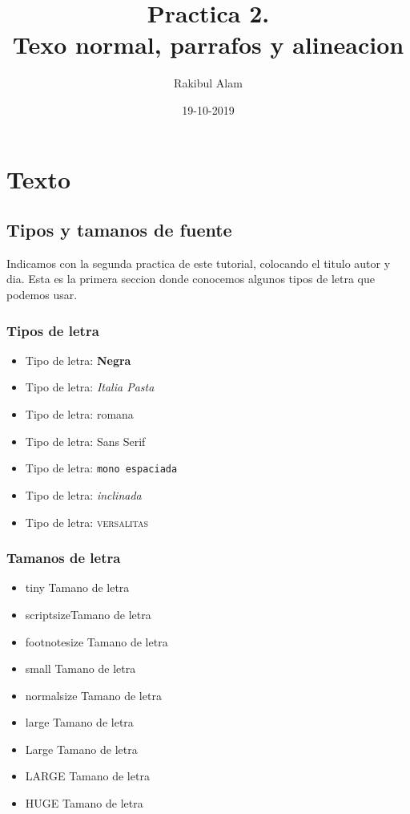 \documentclass[12pt]{book}
\begin{document}
\title{Practica 2.\\ Texo normal, parrafos y alineacion}
\author{Rakibul Alam}
\date{19-10-2019}
\maketitle

\tableofcontents

\chapter{Texto}

\section{Tipos y tamanos de fuente}
Indicamos con la segunda practica de este tutorial, colocando el titulo autor y dia. Esta es la primera seccion donde conocemos algunos tipos de letra que podemos usar. 

\subsection{Tipos de letra}
\begin{itemize}
\item Tipo de letra: \textbf{Negra}
\item Tipo de letra: \textit{Italia Pasta}
\item Tipo de letra: \textrm{romana}
\item Tipo de letra: \textsf{Sans Serif}
\item Tipo de letra: \texttt{mono espaciada}
\item Tipo de letra: \textsl{inclinada}
\item Tipo de letra: \textsc{versalitas}
\end{itemize}

\subsection{Tamanos de letra}
\begin{itemize}
\item {\tiny tiny Tamano} de letra
\item {\scriptsize scriptsizeTamano} de letra
\item {\footnotesize footnotesize Tamano} de letra
\item {\small small Tamano} de letra
\item {\normalsize normalsize Tamano} de letra
\item {\large large Tamano} de letra
\item {\Large Large Tamano} de letra
\item {\LARGE LARGE Tamano} de letra
\item {\Huge HUGE Tamano} de letra
\end{itemize}
\end{document}

